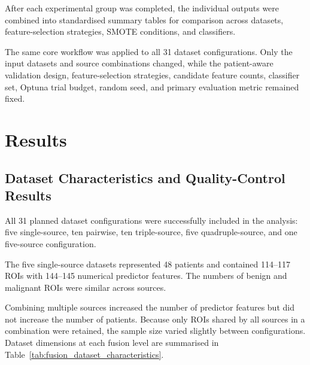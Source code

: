\documentclass[12pt,twocolumn]{article}
\begin{document}
After each experimental group was completed, the individual outputs
were combined into standardised summary tables for comparison across
datasets, feature-selection strategies, SMOTE conditions, and
classifiers.

The same core workflow was applied to all 31 dataset configurations.
Only the input datasets and source combinations changed, while the
patient-aware validation design, feature-selection strategies,
candidate feature counts, classifier set, Optuna trial budget, random
seed, and primary evaluation metric remained fixed.















\section{Results}
\label{sec:results}

\subsection{Dataset Characteristics and Quality-Control Results}
\label{subsec:results_dataset_characteristics}

All 31 planned dataset configurations were successfully included in the
analysis: five single-source, ten pairwise, ten triple-source, five
quadruple-source, and one five-source configuration.

The five single-source datasets represented 48 patients and contained
114--117 ROIs with 144--145 numerical predictor features. The numbers
of benign and malignant ROIs were similar across sources.

Combining multiple sources increased the number of predictor features
but did not increase the number of patients. Because only ROIs shared
by all sources in a combination were retained, the sample size varied
slightly between configurations. Dataset dimensions at each fusion
level are summarised in
Table~\ref{tab:fusion_dataset_characteristics}.
\end{document}
